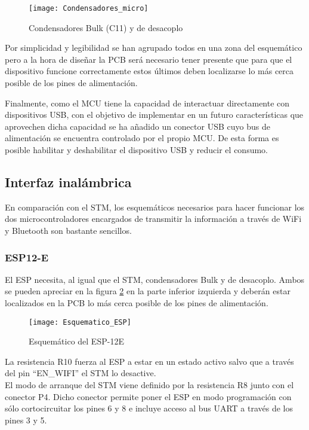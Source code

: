 \begin{figure} [h]
    \centering
    \texttt{[image: Condensadores\_micro]}
    \caption{Condensadores Bulk (C11) y de desacoplo}
    \label{fig:Condensadores_micro}
\end{figure}

 Por simplicidad y legibilidad se han agrupado todos en una zona del esquemático pero a la hora de diseñar la PCB será necesario tener presente que para que el dispositivo funcione correctamente estos últimos deben localizarse lo más cerca posible de los pines de alimentación.

Finalmente, como el \acrshort{MCU} tiene la capacidad de interactuar directamente con dispositivos \acrshort{USB}, con el objetivo de implementar en un futuro características que aprovechen dicha capacidad se ha añadido un conector \acrshort{USB} cuyo bus de alimentación se encuentra controlado por el propio \acrshort{MCU}. De esta forma es posible habilitar y deshabilitar el dispositivo USB y reducir el consumo.

\subsection{Interfaz inalámbrica\label{sec:Esquematico_inalambrica}}

En comparación con el STM, los esquemáticos necesarios para hacer funcionar los dos microcontroladores encargados de transmitir la información a través de WiFi y Bluetooth son bastante sencillos.

\subsubsection{ESP12-E\label{sec:Esquematico_ESP}}

El ESP necesita, al igual que el STM, condensadores Bulk y de desacoplo. Ambos se pueden apreciar en la figura \ref{fig:Esquematico_ESP} en la parte inferior izquierda y deberán estar localizados en la \acrshort{PCB} lo más cerca posible de los pines de alimentación.

\begin{figure} [h]
    \centering
    \texttt{[image: Esquematico\_ESP]}
    \caption{Esquemático del ESP-12E}
    \label{fig:Esquematico_ESP}
\end{figure}

La resistencia R10 fuerza al ESP a estar en un estado activo salvo que a través del pin ``EN\_WIFI'' el STM lo desactive. 
\\El modo de arranque del STM viene definido por la resistencia R8 junto con el conector P4. Dicho conector permite poner el ESP en modo programación con sólo cortocircuitar los pines 6 y 8 e incluye acceso al bus UART a través de los pines 3 y 5.

